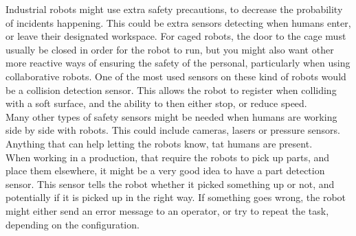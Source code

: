 Industrial robots might use extra safety precautions, to decrease the probability of incidents happening. This could be extra sensors detecting when humans enter, or leave their designated workspace. For caged robots, the door to the cage must usually be closed in order for the robot to run, but you might also want other more reactive ways of ensuring the safety of the personal, particularly when using collaborative robots. One of the most used sensors on these kind of robots would be a collision detection sensor. This allows the robot to register when colliding with a soft surface, and the ability to then either stop, or reduce speed.\\ 

Many other types of safety sensors might be needed when humans are working side by side with robots. This could include cameras, lasers or pressure sensors. Anything that can help letting the robots know, tat humans are present.\\ 

When working in a production, that require the robots to pick up parts, and place them elsewhere, it might be a very good idea to have a part detection sensor. This sensor tells the robot whether it picked something up or not, and potentially if it is picked up in the right way. If something goes wrong, the robot might either send an error message to an operator, or try to repeat the task, depending on the configuration.\\
\cite{sensors}

